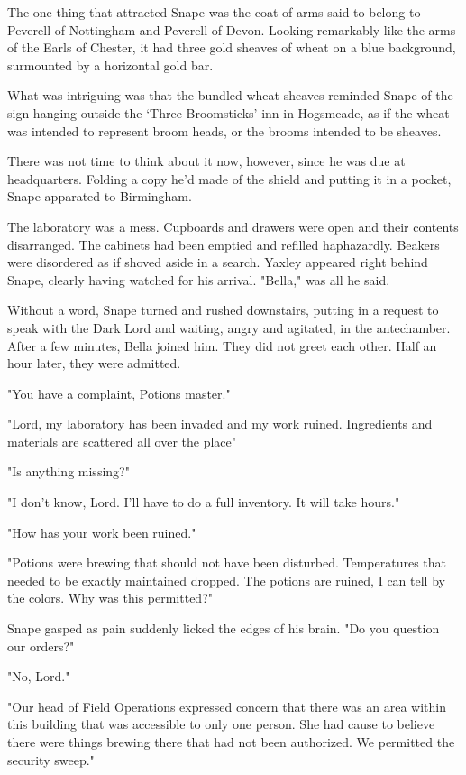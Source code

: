 The one thing that attracted Snape was the coat of arms said to belong to Peverell of Nottingham and Peverell of Devon. Looking remarkably like the arms of the Earls of Chester, it had three gold sheaves of wheat on a blue background, surmounted by a horizontal gold bar.

What was intriguing was that the bundled wheat sheaves reminded Snape of the sign hanging outside the `Three Broomsticks' inn in Hogsmeade, as if the wheat was intended to represent broom heads, or the brooms intended to be sheaves.

There was not time to think about it now, however, since he was due at headquarters. Folding a copy he'd made of the shield and putting it in a pocket, Snape apparated to Birmingham.

The laboratory was a mess. Cupboards and drawers were open and their contents disarranged. The cabinets had been emptied and refilled haphazardly. Beakers were disordered as if shoved aside in a search. Yaxley appeared right behind Snape, clearly having watched for his arrival. "Bella," was all he said.

Without a word, Snape turned and rushed downstairs, putting in a request to speak with the Dark Lord and waiting, angry and agitated, in the antechamber. After a few minutes, Bella joined him. They did not greet each other. Half an hour later, they were admitted.

"You have a complaint, Potions master."

"Lord, my laboratory has been invaded and my work ruined. Ingredients and materials are scattered all over the place{\el}"

"Is anything missing?"

"I don't know, Lord. I'll have to do a full inventory. It will take hours."

"How has your work been ruined."

"Potions were brewing that should not have been disturbed. Temperatures that needed to be exactly maintained dropped. The potions are ruined, I can tell by the colors. Why was this permitted?"

Snape gasped as pain suddenly licked the edges of his brain. "Do you question our orders?"

"No, Lord."

"Our head of Field Operations expressed concern that there was an area within this building that was accessible to only one person. She had cause to believe there were things brewing there that had not been authorized. We permitted the security sweep."

